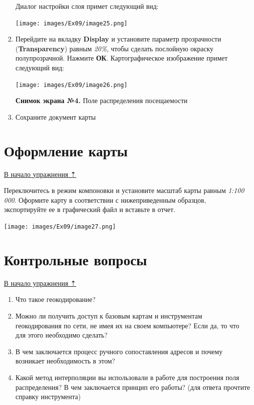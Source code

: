 \documentclass[12pt,]{book}
\begin{document}
\begin{enumerate}
  Диалог настройки слоя примет следующий вид:

  \texttt{[image: images/Ex09/image25.png]}
\item
  Перейдите на вкладку \textbf{Display} и установите параметр прозрачности (\textbf{Transparency}) равным \emph{20\%}, чтобы сделать послойную окраску полупрозрачной. Нажмите \textbf{ОК}. Картографическое изображение примет следующий вид:

  \texttt{[image: images/Ex09/image26.png]}

  \textbf{Снимок экрана №4.} Поле распределения посещаемости
\item
  Сохраните документ карты
\end{enumerate}

\hypertarget{geocoding-design}{%
\section{Оформление карты}\label{geocoding-design}}

\protect\hyperlink{geocoding}{В начало упражнения ⇡}

Переключитесь в режим компоновки и установите масштаб карты равным \emph{1:100 000}. Оформите карту в соответствии с нижеприведенным образцов, экспортируйте ее в графический файл и вставьте в отчет.

\texttt{[image: images/Ex09/image27.png]}

\hypertarget{geocoding-questions}{%
\section{Контрольные вопросы}\label{geocoding-questions}}

\protect\hyperlink{geocoding}{В начало упражнения ⇡}

\begin{enumerate}
\def\labelenumi{\arabic{enumi}.}
\item
  Что такое геокодирование?
\item
  Можно ли получить доступ к базовым картам и инструментам геокодирования по сети, не имея их на своем компьютере? Если да, то что для этого необходимо сделать?
\item
  В чем заключается процесс ручного сопоставления адресов и почему возникает необходимость в этом?
\item
  Какой метод интерполяции вы использовали в работе для построения поля распределения? В чем заключается принцип его работы? (для ответа прочтите справку инструмента)
\end{enumerate}
\end{document}
